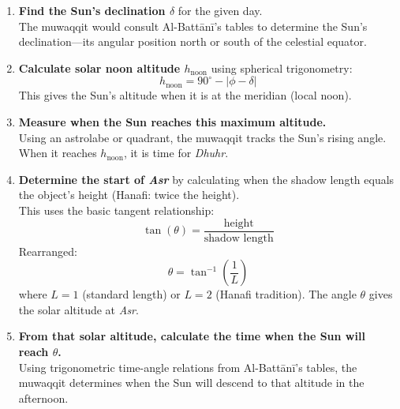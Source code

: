 \begin{enumerate}
    \item \textbf{Find the Sun’s declination \( \delta \)} for the given day.\\
    The muwaqqit would consult Al-Battānī’s tables to determine the Sun’s declination—its angular position north or south of the celestial equator.

    \item \textbf{Calculate solar noon altitude \( h_{\text{noon}} \)} using spherical trigonometry:
    \[
    h_{\text{noon}} = 90^\circ - |\phi - \delta|
    \]
    This gives the Sun’s altitude when it is at the meridian (local noon).

    \item \textbf{Measure when the Sun reaches this maximum altitude.}\\
    Using an astrolabe or quadrant, the muwaqqit tracks the Sun's rising angle. When it reaches \( h_{\text{noon}} \), it is time for \textit{Dhuhr}.

    \item \textbf{Determine the start of \textit{Asr}} by calculating when the shadow length equals the object’s height (Hanafi: twice the height).\\
    This uses the basic tangent relationship:
    \[
    \tan(\theta) = \frac{\text{height}}{\text{shadow length}}
    \]
    Rearranged:
    \[
    \theta = \tan^{-1}\left(\frac{1}{L}\right)
    \]
    where \( L = 1 \) (standard length) or \( L = 2 \) (Hanafi tradition). The angle \( \theta \) gives the solar altitude at \textit{Asr}.

    \item \textbf{From that solar altitude, calculate the time when the Sun will reach \( \theta \).}\\
    Using trigonometric time-angle relations from Al-Battānī’s tables, the muwaqqit determines when the Sun will descend to that altitude in the afternoon.
\end{enumerate}

